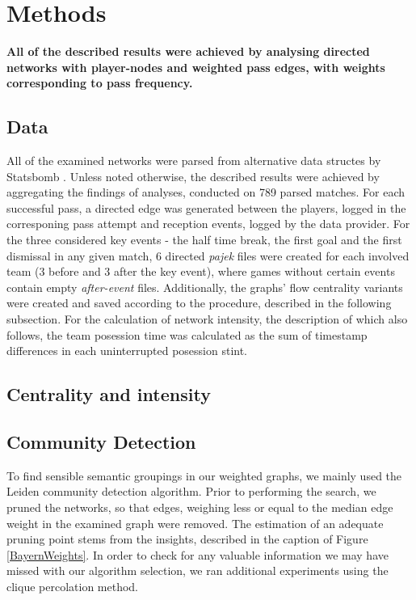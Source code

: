 \documentclass[9pt,twocolumn,twoside]{pnas-report}
\begin{document}
{\small\section*{Methods}

{\bf All of the described results were achieved by analysing directed networks with player-nodes and weighted pass edges, with weights corresponding to pass frequency.} 

\subsection*{Data}
All of the examined networks were parsed from alternative data structes by Statsbomb \cite{statsbomb}. Unless noted otherwise, the described results were achieved by aggregating the findings of analyses, conducted on 789 parsed matches. For each successful pass, a directed edge was generated between the players, logged in the corresponing pass attempt and reception events, logged by the data provider. For the three considered key events - the half time break, the first goal and the first dismissal in any given match, 6 directed \textit{pajek} files were created for each involved team (3 before and 3 after the key event), where games without certain events contain empty \textit{after-event} files. Additionally, the graphs' flow centrality variants were created and saved according to the procedure, described in the following subsection. For the calculation of network intensity, the description of which also follows, the team posession time was calculated as  the sum of timestamp differences in each uninterrupted posession stint.

\subsection*{Centrality and intensity}

\subsection*{Community Detection}
To find sensible semantic groupings in our weighted graphs, we mainly used the Leiden community detection algorithm. Prior to performing the search, we pruned the networks, so that edges, weighing less or equal to the  median edge weight in the examined graph were removed. The estimation of an adequate pruning point stems from the insights, described in the caption of Figure \ref{BayernWeights}. In order to check for any valuable information we may have missed with our algorithm selection, we ran additional experiments using the clique percolation method.

}
\end{document}
